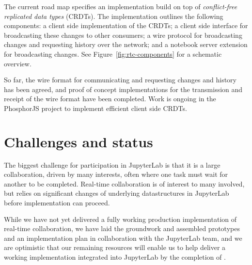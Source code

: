 \documentclass{deliverablereport}
\begin{document}
The current road map specifies an implementation build on top of
\emph{conflict-free replicated data types} (CRDTs). The implementation outlines the
following components: a client side implementation of the CRDTs; a client side interface
for broadcasting these changes to other consumers; a wire protocol for broadcasting
changes and requesting history over the network; and a notebook server extension for broadcasting changes. See Figure~\ref{fig:rtc-components} for a schematic overview.

So far, the wire format for communicating and requesting changes and history has been
agreed, and proof of concept implementations for the transmission and receipt of the
wire format have been completed. Work is ongoing in the PhosphorJS project to implement
efficient client side CRDTs.


\section{Challenges and status}

The biggest challenge for \ODK participation in JupyterLab is that it is a large collaboration, driven by many interests,
often where one task must wait for another to be completed.
Real-time collaboration is of interest to many involved,
but relies on significant changes of underlying datastructures in JupyterLab before implementation can proceed.

While we have not yet delivered a fully working production implementation of real-time collaboration,
we have laid the groundwork and assembled prototypes and an implementation plan
in collaboration with the JupyterLab team,
and we are optimistic that our remaining resources will enable us to help deliver a working implementation integrated into JupyterLab by the completion of .
\end{document}
